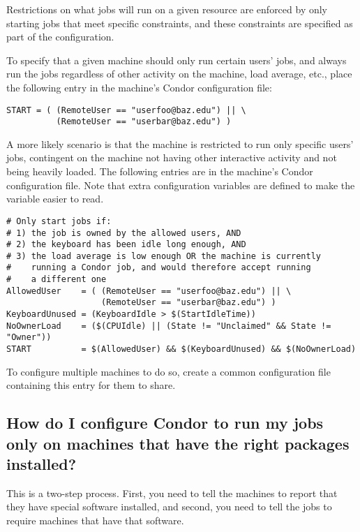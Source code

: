 Restrictions on what jobs will run on a given resource are
enforced by only starting jobs that meet specific constraints,
and these constraints are specified as part of the configuration.

To specify that a given machine should only run certain users' jobs,
and always run the jobs regardless of other activity on the machine,
load average, etc.,
place the following entry in the
machine's Condor configuration file:

\footnotesize
\begin{verbatim}
START = ( (RemoteUser == "userfoo@baz.edu") || \
          (RemoteUser == "userbar@baz.edu") )
\end{verbatim}
\normalsize

A more likely scenario is that the machine is restricted to run
only specific users' jobs, contingent on the machine not having
other interactive activity and not being heavily loaded.
The following entries are in the machine's Condor configuration file. 
Note that extra configuration variables are defined to make 
the  variable easier to read.

\footnotesize
\begin{verbatim}
# Only start jobs if:
# 1) the job is owned by the allowed users, AND
# 2) the keyboard has been idle long enough, AND
# 3) the load average is low enough OR the machine is currently
#    running a Condor job, and would therefore accept running
#    a different one
AllowedUser    = ( (RemoteUser == "userfoo@baz.edu") || \
                   (RemoteUser == "userbar@baz.edu") )
KeyboardUnused = (KeyboardIdle > $(StartIdleTime))
NoOwnerLoad    = ($(CPUIdle) || (State != "Unclaimed" && State != "Owner"))
START          = $(AllowedUser) && $(KeyboardUnused) && $(NoOwnerLoad)
\end{verbatim}
\normalsize

To configure multiple machines to do so, create a common
configuration file containing this entry for them to share.

\subsection*{How do I configure Condor to run my jobs only on machines that have the right packages installed?}

This is a two-step process.
First, you need to tell the machines to report that they have special
software installed, and second, you need to tell the jobs to require
machines that have that software.

